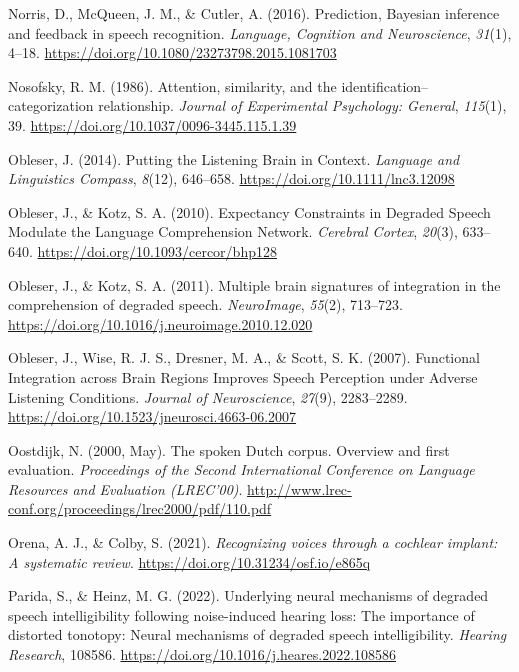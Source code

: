 \documentclass[a4paper, nobind]{templates/ociamthesis}
\newlength{\cslhangindent}
\newenvironment{CSLReferences}[2] %
 {%
  \setlength{\parindent}{0pt}
  \ifodd #1
  \let\oldpar\par
  \def\par{\hangindent=\cslhangindent\oldpar}
  \fi
  \setlength{\parskip}{1mm}
  \setlength{\baselineskip}{6mm}
 }%
 {}
\begin{document}
\begin{CSLReferences}{1}{0}
\leavevmode{}%
Norris, D., McQueen, J. M., \& Cutler, A. (2016). {Prediction, Bayesian inference and feedback in speech recognition}. \emph{Language, Cognition and Neuroscience}, \emph{31}(1), 4--18. \url{https://doi.org/10.1080/23273798.2015.1081703}

\leavevmode{}%
Nosofsky, R. M. (1986). Attention, similarity, and the identification--categorization relationship. \emph{Journal of Experimental Psychology: General}, \emph{115}(1), 39. \url{https://doi.org/10.1037/0096-3445.115.1.39}

\leavevmode{}%
Obleser, J. (2014). Putting the Listening Brain in Context. \emph{Language and Linguistics Compass}, \emph{8}(12), 646--658. \url{https://doi.org/10.1111/lnc3.12098}

\leavevmode{}%
Obleser, J., \& Kotz, S. A. (2010). Expectancy Constraints in Degraded Speech Modulate the Language Comprehension Network. \emph{Cerebral Cortex}, \emph{20}(3), 633--640. \url{https://doi.org/10.1093/cercor/bhp128}

\leavevmode{}%
Obleser, J., \& Kotz, S. A. (2011). Multiple brain signatures of integration in the comprehension of degraded speech. \emph{NeuroImage}, \emph{55}(2), 713--723. \url{https://doi.org/10.1016/j.neuroimage.2010.12.020}

\leavevmode{}%
Obleser, J., Wise, R. J. S., Dresner, M. A., \& Scott, S. K. (2007). Functional Integration across Brain Regions Improves Speech Perception under Adverse Listening Conditions. \emph{Journal of Neuroscience}, \emph{27}(9), 2283--2289. \url{https://doi.org/10.1523/jneurosci.4663-06.2007}

\leavevmode{}%
Oostdijk, N. (2000, May). The spoken {D}utch corpus. Overview and first evaluation. \emph{Proceedings of the Second International Conference on Language Resources and Evaluation ({LREC}{'}00)}. \url{http://www.lrec-conf.org/proceedings/lrec2000/pdf/110.pdf}

\leavevmode{}%
Orena, A. J., \& Colby, S. (2021). \emph{Recognizing voices through a cochlear implant: A systematic review}. \url{https://doi.org/10.31234/osf.io/e865q}

\leavevmode{}%
Parida, S., \& Heinz, M. G. (2022). Underlying neural mechanisms of degraded speech intelligibility following noise-induced hearing loss: The importance of distorted tonotopy: Neural mechanisms of degraded speech intelligibility. \emph{Hearing Research}, 108586. \url{https://doi.org/10.1016/j.heares.2022.108586}


\end{CSLReferences}
\end{document}
